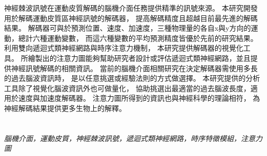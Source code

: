 神經棘波訊號在運動皮質解碼的腦機介面任務提供精準的訊號來源。
本研究開發用於解碼運動皮質區神經訊號的解碼器，
提高解碼精度且超越目前最先進的解碼結果。
解碼器可與於預測位置、速度、加速度，三種物理量的各自x與y方向的運動，總計六種運動變數，
而這六種變數的平均預測精度皆優於先前的研究結果。
利用雙向遞迴式類神經網路與時序注意力機制，
本研究提供解碼器的視覺化工具。
所繪製出的注意力圖能夠幫助研究者設計或評估遞迴式類神經網路，並且提供神經訊號解碼的相關資訊。
當前的腦機介面相關研究在決定解碼器需使用多長的過去腦波資訊時，
是以任意挑選或經驗法則的方式做選擇。
本研究提供的分析工具除了視覺化腦波資訊外也可做量化，
協助挑選出最適當的過去腦波長度，適用於速度與加速度解碼器。
注意力圖所得到的資訊也與神經科學的理論相符，
為神經解碼結果提供更多生物上的解釋。
\\
\\
\\
\textit{腦機介面，運動皮質，神經棘波訊號，遞迴式類神經網路，時序特徵模組，注意力圖}